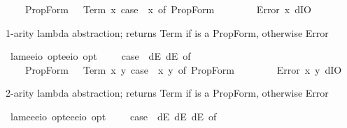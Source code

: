 \begin{isabellebody}
\ \ \ \ PropForm\ {\isasymphi}\ {\isasymRightarrow}\ Term\ {\isacharparenleft}{\isasymlambda}x{\isachardot}\ case\ {\isacharparenleft}{\isasymPhi}\ x{\isacharparenright}\ of\ PropForm\ {\isasymphi}\ {\isasymRightarrow}\ {\isasymphi}{\isacharparenright}\isanewline
\ \ {\isacharbar}\ {\isacharunderscore}\ {\isasymRightarrow}\ Error\ {\isacharparenleft}{\isasymlambda}x{\isachardot}\ dIO{\isacharparenright}{\isachardoublequoteclose}%
\begin{isamarkuptext}%
1-arity lambda abstraction;  returns Term  if \isa{{\isasymphi}} is a PropForm, 
otherwise Error%
\end{isamarkuptext}%
\isamarkuptrue%
\isamarkupfalse%
\ lam{}{\isacharcolon}{\isacharcolon}{\isachardoublequoteopen}{\isacharparenleft}e{\isasymRightarrow}e{\isasymRightarrow}io\ opt{\isacharparenright}{\isasymRightarrow}{\isacharparenleft}e{\isasymRightarrow}e{\isasymRightarrow}io{\isacharparenright}\ opt{\isachardoublequoteclose}\ \ {\isachardoublequoteopen}{\isasymlambda}\ {\isasymPhi}\ {\isasymequiv}\ case\ {\isacharparenleft}{\isasymPhi}\ dE\ dE{\isacharparenright}\ of\isanewline
\ \ \ \ PropForm\ {\isasymphi}\ {\isasymRightarrow}\ Term\ {\isacharparenleft}{\isasymlambda}x\ y{\isachardot}\ case\ {\isacharparenleft}{\isasymPhi}\ x\ y{\isacharparenright}\ of\ PropForm\ {\isasymphi}\ {\isasymRightarrow}\ {\isasymphi}{\isacharparenright}\isanewline
\ \ {\isacharbar}\ {\isacharunderscore}\ {\isasymRightarrow}\ Error\ {\isacharparenleft}{\isasymlambda}x\ y{\isachardot}\ dIO{\isacharparenright}{\isachardoublequoteclose}%
\begin{isamarkuptext}%
2-arity lambda abstraction;  returns Term  if \isa{{\isasymphi}} is a PropForm, 
otherwise Error%
\end{isamarkuptext}%
\isamarkuptrue%
\isamarkupfalse%
\ lam{}{\isacharcolon}{\isacharcolon}{\isachardoublequoteopen}{\isacharparenleft}e{\isasymRightarrow}e{\isasymRightarrow}e{\isasymRightarrow}io\ opt{\isacharparenright}{\isasymRightarrow}{\isacharparenleft}e{\isasymRightarrow}e{\isasymRightarrow}e{\isasymRightarrow}io{\isacharparenright}\ opt{\isachardoublequoteclose}\ \ {\isachardoublequoteopen}{\isasymlambda}\ {\isasymPhi}\ {\isasymequiv}\ case\ {\isacharparenleft}{\isasymPhi}\ dE\ dE\ dE{\isacharparenright}\ of\isanewline

\end{isabellebody}
